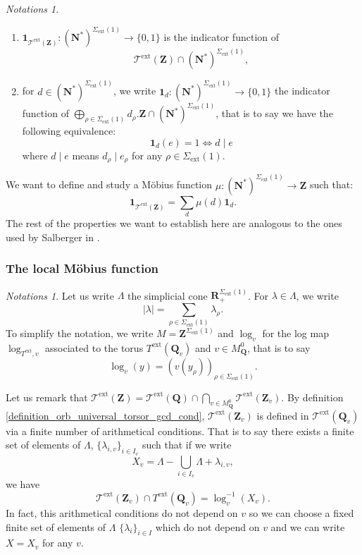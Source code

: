 \documentclass{proc-l}
\newcommand{\R}{\mathbf{R}}
\newcommand{\Z}{\mathbf{Z}}
\newcommand{\N}{\mathbf{N}}
\newcommand{\Q}{\mathbf{Q}}
\DeclareMathOperator{\ext}{ext}
\newcommand{\stackT}{\mathcal{T}}
\theoremstyle{definition}
\theoremstyle{remark}
\newtheorem{Notations}[theorem]{Notations}
\numberwithin{equation}{section}
\begin{document}
\begin{Notations}
\begin{enumerate}
    \item $\mathbf{1}_{\stackT^{\ext}(\Z)} : (\N^*)^{\Sigma_{\ext}(1)} \rightarrow \{0,1\}$ is the indicator function of $$\stackT^{\ext}(\Z) \cap (\N^*)^{\Sigma_{\ext}(1)},$$
    \item for $d \in (\N^*)^{\Sigma_{\ext}(1)}$, we write $\mathbf{1}_{d} : (\N^*)^{\Sigma_{\ext}(1)} \rightarrow \{0,1\}$ the indicator function of $\bigoplus\limits_{\rho \in \Sigma_{\ext}(1)} d_{\rho}.\Z \cap (\N^*)^{\Sigma_{\ext}(1)}$, that is to say we have the following equivalence: $$\mathbf{1}_{d}(e) = 1 \Leftrightarrow  d \mid e $$where $d \mid e$ means $d_{\rho} \mid e_{\rho}$ for any $\rho \in \Sigma_{\ext}(1)$. 
\end{enumerate}
\end{Notations}

We want to define and study a Möbius function $\mu : (\N^*)^{\Sigma_{\ext}(1)} \rightarrow \Z$ such that:
$$\mathbf{1}_{\stackT^{\ext}(\Z)} = \sum\limits_d \mu(d) \mathbf{1}_{d}  .$$The rest of the properties we want to establish here are analogous to the ones used by Salberger in \cite[lemmas 11.15-11.19]{salberger_torsor}.

\subsubsection{The local Möbius function}

\begin{Notations}
    Let us write $\Lambda$ the simplicial cone $\R_+^{\Sigma_{\ext}(1)}$. For $\lambda \in \Lambda$, we write $$|\lambda| = \sum\limits_{\rho \in \Sigma_{\ext}(1) } \lambda_{\rho} .$$
    To simplify the notation, we write $M = \Z^{\Sigma_{\ext}(1)}$ and $\log_v$ for the log map $\log_{T^{\ext},v}$ associated to the torus $T^{\ext}(\Q_v)$ and $v \in M_{\Q}^0$, that is to say $$\log_v(y) = (v(y_{\rho}))_{\rho \in \Sigma_{\ext}(1)} .$$
\end{Notations}

Let us remark that $\stackT^{\ext}(\Z) = \stackT^{\ext}(\Q) \cap \bigcap\limits_{v \in M_{\Q}^0} \stackT^{\ext}(\Z_v)$. By definition \ref{definition_orb_universal_torsor_gcd_cond}, $\stackT^{\ext}(\Z_v)$ is defined in $\stackT^{\ext}(\Q_v)$ via a finite number of arithmetical conditions. That is to say there exists a finite set of elements of $\Lambda$, $\{ \lambda_{i,v} \}_{i \in I_v}$ such that if we write $$X_v = \Lambda - \bigcup\limits_{i \in I_v} \Lambda + \lambda_{i,v} ,$$we have $$\stackT^{\ext}(\Z_v) \cap T^{\ext}(\Q_v) = \log_v^{-1}(X_v) .$$In fact, this arithmetical conditions do not depend on $v$ so we can choose a fixed finite set of elements of $\Lambda$ $\{ \lambda_{i} \}_{i \in I}$ which do not depend on $v$ and we can write $X = X_v$ for any $v$.
\end{document}

